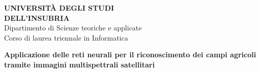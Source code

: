 
\begin{center}
    \textbf{\Large UNIVERSITÀ DEGLI STUDI\\ DELL’INSUBRIA}\\
    \vspace{0.3cm}
    Dipartimento di Scienze teoriche e applicate\\
    Corso di laurea triennale in Informatica
\end{center}

\vspace{2cm}


\vspace{1cm}


\begin{center}
    {\LARGE \textbf{Applicazione delle reti neurali per il riconoscimento dei campi agricoli tramite immagini multispettrali satellitari}} \\
\end{center}

\vspace{2cm}




